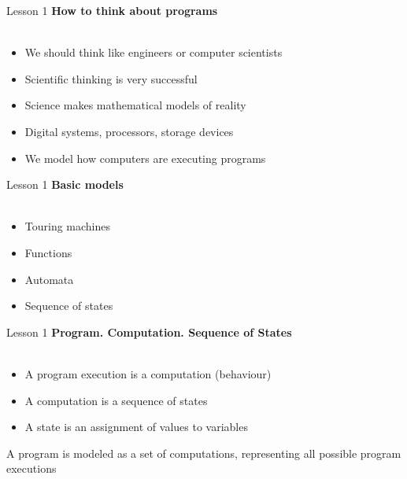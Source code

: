 \documentclass[aspectratio=1610]{beamer}
\begin{document}
\begin{frame}{Lesson 1}{}
\Large
\textbf{How to think about programs}\\~\\

\Large{
\begin{itemize}
    \item We should think like engineers or computer scientists
    \item Scientific thinking is very successful
    \item Science makes mathematical models of reality
	\item Digital systems, processors, storage devices
    \item We model how computers are executing programs
\end{itemize}}

\end{frame}



\begin{frame}{Lesson 1}{}
\Large
\textbf{Basic models}\\~\\

\Large{
\begin{itemize}
    \item Touring machines 
    \item Functions
    \item Automata
    \item Sequence of states
\end{itemize}}

\end{frame}




\begin{frame}{Lesson 1}{}
\Large
\textbf{Program. Computation. Sequence of States}\\~\\

\Large{
\begin{itemize}
    \item A program execution is a computation (behaviour)
    \item A computation is a sequence of states    
    \item A state is an assignment of values to variables
\end{itemize}}

\Large {A program is modeled as a set of computations, representing all possible program executions}
\end{frame}
\end{document}

